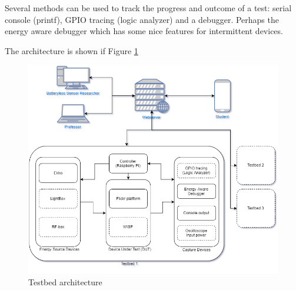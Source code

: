 Several methods can be used to track the progress and outcome of a test: serial console (printf), GPIO tracing (logic analyzer) and a debugger. Perhaps the energy aware debugger which has some nice features for intermittent devices.

The architecture is shown if Figure \ref{fig:architecture}

\begin{figure}[htb]
\includegraphics[width=\textwidth]{pics/testbed-architecture-v2}
\caption{Testbed architecture}
\label{fig:architecture}
\end{figure}

